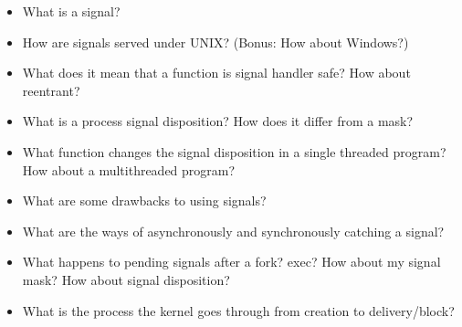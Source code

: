 \begin{itemize}
\tightlist
\item
  What is a signal?
\item
  How are signals served under UNIX? (Bonus: How about Windows?)
\item
  What does it mean that a function is signal handler safe? How about reentrant?
\item
  What is a process signal disposition? How does it differ from a mask?
\item
  What function changes the signal disposition in a single threaded program?
  How about a multithreaded program?
\item
  What are some drawbacks to using signals?
\item
  What are the ways of asynchronously and synchronously catching a signal?
\item
  What happens to pending signals after a fork? exec? How about my signal mask? How about signal disposition?
\item
  What is the process the kernel goes through from creation to delivery/block?
\end{itemize}



